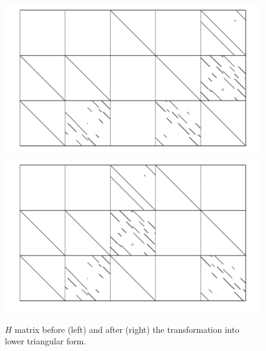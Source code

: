                 \begin{figure}
                \centering
                \includegraphics[width=0.4\linewidth]{Figures/HRUa.jpg}
                \includegraphics[width=0.4\linewidth]{Figures/HRUb.jpg}
                        \caption{$H$ matrix before (left) and after (right) the transformation into lower triangular form.}
                \label{fig:RUH}
                \end{figure}                    
            




